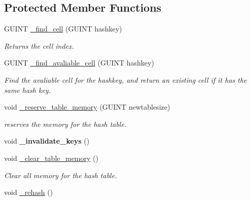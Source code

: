 \subsection*{Protected Member Functions}
\begin{DoxyCompactItemize}
\item 
\hypertarget{classgim__hash__table_aaaff4cea9e6b86276d364041e651605f}{G\+U\+I\+N\+T \hyperlink{classgim__hash__table_aaaff4cea9e6b86276d364041e651605f}{\+\_\+find\+\_\+cell} (G\+U\+I\+N\+T hashkey)}\label{classgim__hash__table_aaaff4cea9e6b86276d364041e651605f}

\begin{DoxyCompactList}\small\item\em Returns the cell index. \end{DoxyCompactList}\item 
\hypertarget{classgim__hash__table_acc2d3d29a0190232386fb155ec9e5d8f}{G\+U\+I\+N\+T \hyperlink{classgim__hash__table_acc2d3d29a0190232386fb155ec9e5d8f}{\+\_\+find\+\_\+avaliable\+\_\+cell} (G\+U\+I\+N\+T hashkey)}\label{classgim__hash__table_acc2d3d29a0190232386fb155ec9e5d8f}

\begin{DoxyCompactList}\small\item\em Find the avaliable cell for the hashkey, and return an existing cell if it has the same hash key. \end{DoxyCompactList}\item 
void \hyperlink{classgim__hash__table_a4d9347e131c0e17ac2d4966c092817f8}{\+\_\+reserve\+\_\+table\+\_\+memory} (G\+U\+I\+N\+T newtablesize)
\begin{DoxyCompactList}\small\item\em reserves the memory for the hash table. \end{DoxyCompactList}\item 
\hypertarget{classgim__hash__table_ab638970e2ec565cc9cfd473612127358}{void {\bfseries \+\_\+invalidate\+\_\+keys} ()}\label{classgim__hash__table_ab638970e2ec565cc9cfd473612127358}

\item 
\hypertarget{classgim__hash__table_a06933fdb198971dcd753564d1d6e9424}{void \hyperlink{classgim__hash__table_a06933fdb198971dcd753564d1d6e9424}{\+\_\+clear\+\_\+table\+\_\+memory} ()}\label{classgim__hash__table_a06933fdb198971dcd753564d1d6e9424}

\begin{DoxyCompactList}\small\item\em Clear all memory for the hash table. \end{DoxyCompactList}\item 
\hypertarget{classgim__hash__table_aa33115e75d8cc5c489fa6ce8b1a23654}{void \hyperlink{classgim__hash__table_aa33115e75d8cc5c489fa6ce8b1a23654}{\+\_\+rehash} ()}\label{classgim__hash__table_aa33115e75d8cc5c489fa6ce8b1a23654}


\end{DoxyCompactItemize}

